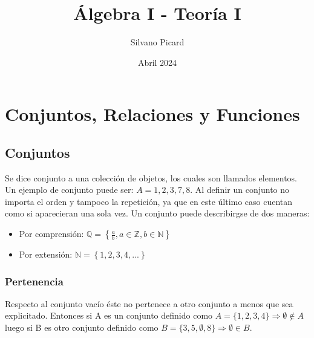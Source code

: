 \documentclass{report}
\title{Álgebra I - Teoría I}
\author{Silvano Picard}
\date{Abril 2024}
\begin{document}

\BgThispage

\maketitle


\tableofcontents 

\chapter{Conjuntos, Relaciones y Funciones}

\section{Conjuntos}

Se dice conjunto a una colección de objetos, los cuales son llamados elementos. Un ejemplo de conjunto puede ser: \begin{math}
    A = {1,2,3,7,8}
\end{math}. Al definir un conjunto no importa el orden y tampoco la repetición, ya que en este último caso cuentan como si aparecieran una sola vez.
    Un conjunto puede describirgse de dos maneras: 
    \begin{itemize}
        \item Por comprensión: \begin{math}
            \mathbb{Q} = \left\{\frac{a}{b}, a \in \mathbb{Z}, b \in \mathbb{N}\right\}
        \end{math}
        \item Por extensión: \begin{math}
            \mathbb{N} = \left\{1,2,3,4,...\right\}
        \end{math}
    \end{itemize}
\subsection{Pertenencia}
Respecto al conjunto vacío éste no pertenece a otro conjunto a menos que sea explicitado. Entonces si A es un conjunto definido como \begin{math}
    A = \{1,2,3,4\} \Rightarrow \emptyset \notin A
\end{math} luego si B es otro conjunto definido como \begin{math}
    B = \{3,5,\emptyset,8\} \Rightarrow \emptyset \in B.
\end{math}
\end{document}
